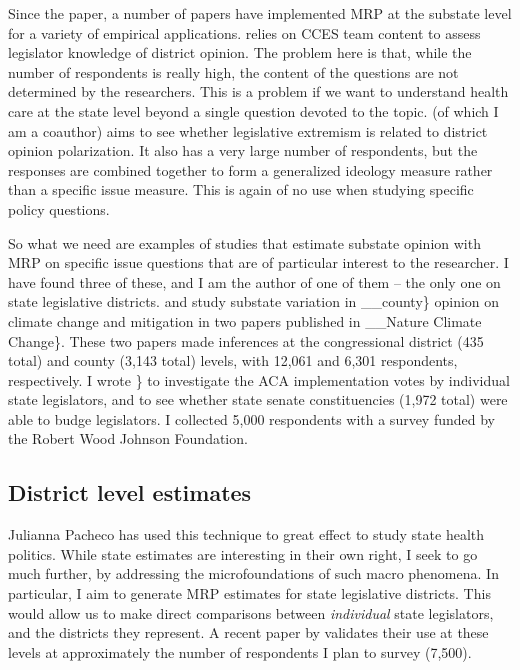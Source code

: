 \documentclass[
  oneside]{book}
\begin{document}
Since the \citet{Warshaw:2012} paper, a number of papers have implemented MRP at the substate level for a variety of empirical applications. \citet{Broockman:2017} relies on CCES team content to assess legislator knowledge of district opinion. The problem here is that, while the number of respondents is really high, the content of the questions are not determined by the researchers. This is a problem if we want to understand health care at the state level beyond a single question devoted to the topic. \citet{Rodden:2018} (of which I am a coauthor) aims to see whether legislative extremism is related to district opinion polarization. It also has a very large number of respondents, but the responses are combined together to form a generalized ideology measure rather than a specific issue measure. This is again of no use when studying specific policy questions.

So what we need are examples of studies that estimate substate opinion with MRP on specific issue questions that are of particular interest to the researcher. I have found three of these, and I am the author of one of them -- the only one on state legislative districts. \citet{Howe:2015} and \citet{Zhang:2018} study substate variation in \_\_county\} opinion on climate change and mitigation in two papers published in \_\_Nature Climate Change\}. These two papers made inferences at the congressional district (435 total) and county (3,143 total) levels, with 12,061 and 6,301 respondents, respectively. I wrote \citet{Shor:2018}\} to investigate the ACA implementation votes by individual state legislators, and to see whether state senate constituencies (1,972 total) were able to budge legislators. I collected 5,000 respondents with a survey funded by the Robert Wood Johnson Foundation.

\hypertarget{district-level-estimates}{%
\subsection{District level estimates}\label{district-level-estimates}}

Julianna Pacheco has used this technique to great effect to study state health politics. While state estimates are interesting in their own right, I seek to go much further, by addressing the microfoundations of such macro phenomena. In particular, I aim to generate MRP estimates for state legislative districts. This would allow us to make direct comparisons between \emph{individual} state legislators, and the districts they represent. A recent paper by \citet{Warshaw:2012} validates their use at these levels at approximately the number of respondents I plan to survey (7,500).
\end{document}
